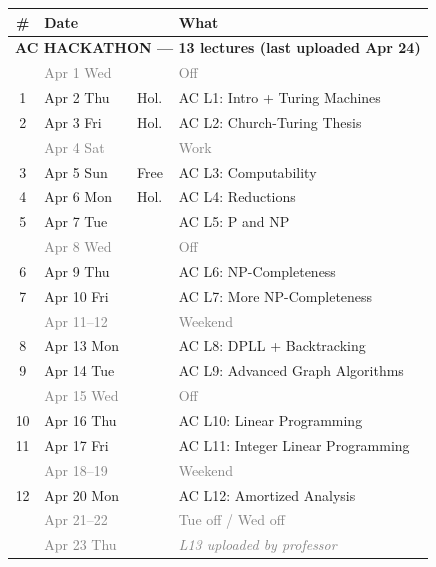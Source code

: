 \documentclass[11pt,a4paper]{article}
\begin{document}
\small
\renewcommand{\arraystretch}{1.12}
\begin{center}
\begin{tabular}{clll}
\toprule
\textbf{\#} & \textbf{Date} & & \textbf{What} \\
\midrule
\multicolumn{4}{l}{\textcolor{accolor}{\textbf{AC HACKATHON --- 13 lectures (last uploaded Apr 24)}}} \\
\midrule
  & \textcolor{gray}{Apr 1 Wed} & & \textcolor{gray}{Off} \\
1 & Apr 2 Thu & \textcolor{successgreen}{Hol.} & \textcolor{accolor}{AC L1: Intro + Turing Machines} \\
2 & Apr 3 Fri & \textcolor{successgreen}{Hol.} & \textcolor{accolor}{AC L2: Church-Turing Thesis} \\
  & \textcolor{gray}{Apr 4 Sat} & & \textcolor{gray}{Work} \\
3 & Apr 5 Sun & \textcolor{successgreen}{Free} & \textcolor{accolor}{AC L3: Computability} \\
4 & Apr 6 Mon & \textcolor{successgreen}{Hol.} & \textcolor{accolor}{AC L4: Reductions} \\
5 & Apr 7 Tue & & \textcolor{accolor}{AC L5: P and NP} \\
  & \textcolor{gray}{Apr 8 Wed} & & \textcolor{gray}{Off} \\
6 & Apr 9 Thu & & \textcolor{accolor}{AC L6: NP-Completeness} \\
7 & Apr 10 Fri & & \textcolor{accolor}{AC L7: More NP-Completeness} \\
  & \textcolor{gray}{Apr 11--12} & & \textcolor{gray}{Weekend} \\
8 & Apr 13 Mon & & \textcolor{accolor}{AC L8: DPLL + Backtracking} \\
9 & Apr 14 Tue & & \textcolor{accolor}{AC L9: Advanced Graph Algorithms} \\
  & \textcolor{gray}{Apr 15 Wed} & & \textcolor{gray}{Off} \\
10 & Apr 16 Thu & & \textcolor{accolor}{AC L10: Linear Programming} \\
11 & Apr 17 Fri & & \textcolor{accolor}{AC L11: Integer Linear Programming} \\
  & \textcolor{gray}{Apr 18--19} & & \textcolor{gray}{Weekend} \\
12 & Apr 20 Mon & & \textcolor{accolor}{AC L12: Amortized Analysis} \\
  & \textcolor{gray}{Apr 21--22} & & \textcolor{gray}{Tue off / Wed off} \\
  & \textcolor{gray}{Apr 23 Thu} & & \textcolor{gray}{\textit{L13 uploaded by professor}} \\

\end{tabular}
\end{center}
\end{document}

